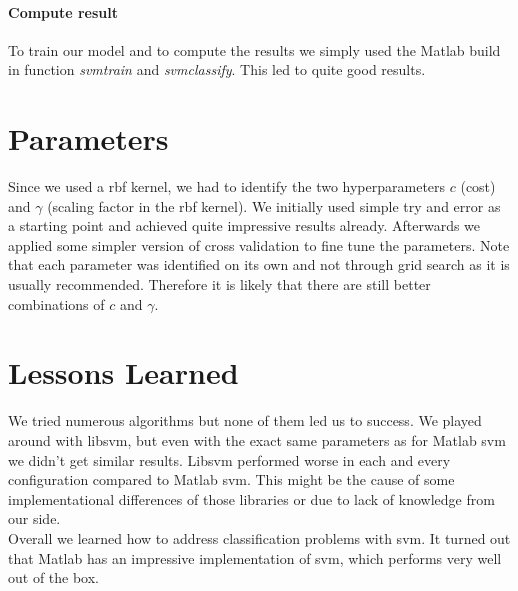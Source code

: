 \documentclass[a4paper, 11pt]{article}
\begin{document}
\paragraph{Compute result}
To train our model and to compute the results we simply used the Matlab build in function \textit{svmtrain} and \textit{svmclassify}. This led to quite good results.

\section{Parameters}
Since we used a rbf kernel, we had to identify the two hyperparameters $c$ (cost) and $\gamma$ (scaling factor in the rbf kernel). We initially used simple try and error as a starting point and achieved quite impressive results already. Afterwards we applied some simpler version of cross validation to fine tune the parameters. Note that each parameter was identified on its own and not through grid search as it is usually recommended. Therefore it is likely that there are still better combinations of $c$ and $\gamma$. 


\section{Lessons Learned} 
We tried numerous algorithms but none of them led us to success. We played around with libsvm, but even with the exact same parameters as for Matlab svm we didn't get similar results. Libsvm performed worse in each and every configuration compared to Matlab svm. This might be the cause of some implementational differences of those libraries or due to lack of knowledge from our side. \\
Overall we learned how to address classification problems with svm. It turned out that Matlab has an impressive implementation of svm, which performs very well out of the box.
\end{document}
